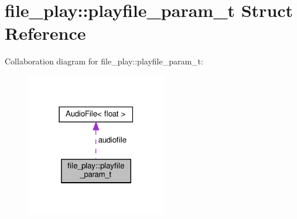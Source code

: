 \hypertarget{structfile__play_1_1playfile__param__t}{}\section{file\+\_\+play\+:\+:playfile\+\_\+param\+\_\+t Struct Reference}
\label{structfile__play_1_1playfile__param__t}


Collaboration diagram for file\+\_\+play\+:\+:playfile\+\_\+param\+\_\+t\+:\nopagebreak
\begin{figure}[H]
\begin{center}
\leavevmode
\includegraphics[width=174pt]{structfile__play_1_1playfile__param__t__coll__graph}
\end{center}
\end{figure}

